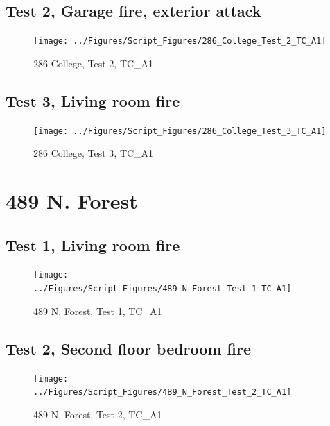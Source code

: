 \documentclass[11pt,oneside]{book}
\begin{document}
\clearpage


\subsection{Test 2, Garage fire, exterior attack}

\begin{figure}[!ht]
\texttt{[image: ../Figures/Script\_Figures/286\_College\_Test\_2\_TC\_A1]}
\caption{286 College, Test 2, TC\_A1}
\label{fig:286_College_Test_2_TC_A1}
\end{figure}


\clearpage


\subsection{Test 3, Living room fire}

\begin{figure}[!ht]
\texttt{[image: ../Figures/Script\_Figures/286\_College\_Test\_3\_TC\_A1]}
\caption{286 College, Test 3, TC\_A1}
\label{fig:286_College_Test_3_TC_A1}
\end{figure}


\clearpage


\section{489 N. Forest}

\subsection{Test 1, Living room fire}

\begin{figure}[!ht]
\texttt{[image: ../Figures/Script\_Figures/489\_N\_Forest\_Test\_1\_TC\_A1]}
\caption{489 N. Forest, Test 1, TC\_A1}
\label{fig:489_N_Forest_Test_1_TC_A1}
\end{figure}

\subsection{Test 2, Second floor bedroom fire}

\begin{figure}[!ht]
\texttt{[image: ../Figures/Script\_Figures/489\_N\_Forest\_Test\_2\_TC\_A1]}
\caption{489 N. Forest, Test 2, TC\_A1}
\label{fig:489_N_Forest_Test_2_TC_A1}
\end{figure}

\clearpage
\end{document}
